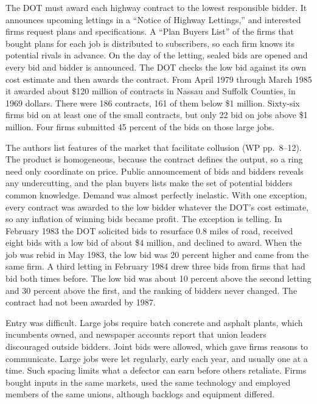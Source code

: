 The DOT must award each highway contract to the lowest responsible bidder. It announces upcoming lettings in a
``Notice of Highway Lettings,'' and interested firms request plans and specifications. A ``Plan Buyers List'' of
the firms that bought plans for each job is distributed to subscribers, so each firm knows its potential rivals in
advance. On the day of the letting, sealed bids are opened and every bid and bidder is announced. The DOT checks
the low bid against its own cost estimate and then awards the contract. From April 1979 through March 1985 it
awarded about \$120 million of contracts in Nassau and Suffolk Counties, in 1969 dollars. There were 186 contracts,
161 of them below \$1 million. Sixty-six firms bid on at least one of the small contracts, but only 22 bid on jobs
above \$1 million. Four firms submitted 45 percent of the bids on those large jobs.

The authors list features of the market that facilitate collusion (WP pp.~8--12). The product is homogeneous,
because the contract defines the output, so a ring need only coordinate on price. Public announcement of bids and
bidders reveals any undercutting, and the plan buyers lists make the set of potential bidders common knowledge.
Demand was almost perfectly inelastic. With one exception, every contract was awarded to the low bidder whatever
the DOT's cost estimate, so any inflation of winning bids became profit. The exception is telling. In February
1983 the DOT solicited bids to resurface 0.8 miles of road, received eight bids with a low bid of about \$4 million,
and declined to award. When the job was rebid in May 1983, the low bid was 20 percent higher and came from the same
firm. A third letting in February 1984 drew three bids from firms that had bid both times before. The low bid was
about 10 percent above the second letting and 30 percent above the first, and the ranking of bidders never changed.
The contract had not been awarded by 1987.

Entry was difficult. Large jobs require batch concrete and asphalt plants, which incumbents owned, and newspaper
accounts report that union leaders discouraged outside bidders. Joint bids were allowed, which gave firms reasons to
communicate. Large jobs were let regularly, early each year, and usually one at a time. Such spacing limits what a
defector can earn before others retaliate. Firms bought inputs in the same markets, used the same technology and
employed members of the same unions, although backlogs and equipment differed.

